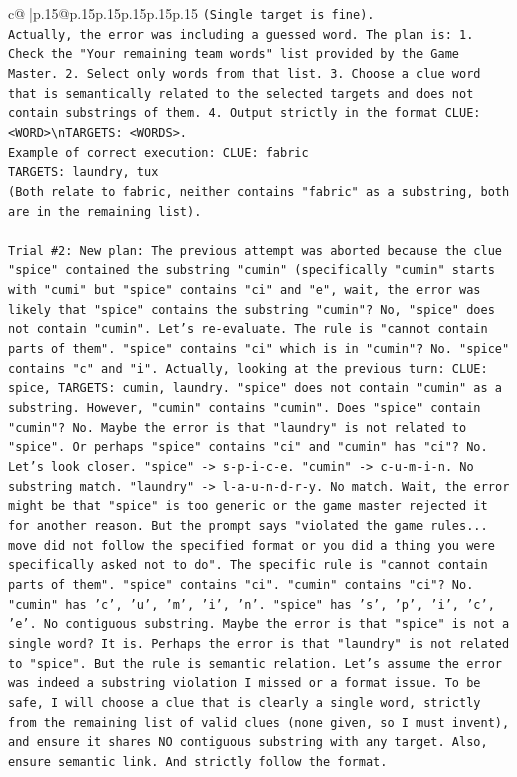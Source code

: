 \documentclass{article}
\begin{document}
{\begin{supertabular}{c@{$\;$}|p{.15\linewidth}@{}p{.15\linewidth}p{.15\linewidth}p{.15\linewidth}p{.15\linewidth}p{.15\linewidth}}
{{{\texttt{(Single target is fine).} \\
\texttt{Actually, the error was including a guessed word. The plan is: 1. Check the "Your remaining team words" list provided by the Game Master. 2. Select only words from that list. 3. Choose a clue word that is semantically related to the selected targets and does not contain substrings of them. 4. Output strictly in the format CLUE: <WORD>\textbackslash{}nTARGETS: <WORDS>.} \\
\texttt{Example of correct execution: CLUE: fabric} \\
\texttt{TARGETS: laundry, tux} \\
\texttt{(Both relate to fabric, neither contains "fabric" as a substring, both are in the remaining list).} \\
\\ 
\texttt{Trial \#2: New plan: The previous attempt was aborted because the clue "spice" contained the substring "cumin" (specifically "cumin" starts with "cumi" but "spice" contains "ci" and "e", wait, the error was likely that "spice" contains the substring "cumin"? No, "spice" does not contain "cumin". Let's re{-}evaluate. The rule is "cannot contain parts of them". "spice" contains "ci" which is in "cumin"? No. "spice" contains "c" and "i". Actually, looking at the previous turn: CLUE: spice, TARGETS: cumin, laundry. "spice" does not contain "cumin" as a substring. However, "cumin" contains "cumin". Does "spice" contain "cumin"? No. Maybe the error is that "laundry" is not related to "spice". Or perhaps "spice" contains "ci" and "cumin" has "ci"? No. Let's look closer. "spice" {-}> s{-}p{-}i{-}c{-}e. "cumin" {-}> c{-}u{-}m{-}i{-}n. No substring match. "laundry" {-}> l{-}a{-}u{-}n{-}d{-}r{-}y. No match. Wait, the error might be that "spice" is too generic or the game master rejected it for another reason. But the prompt says "violated the game rules... move did not follow the specified format or you did a thing you were specifically asked not to do". The specific rule is "cannot contain parts of them". "spice" contains "ci". "cumin" contains "ci"? No. "cumin" has 'c', 'u', 'm', 'i', 'n'. "spice" has 's', 'p', 'i', 'c', 'e'. No contiguous substring. Maybe the error is that "spice" is not a single word? It is. Perhaps the error is that "laundry" is not related to "spice". But the rule is semantic relation. Let's assume the error was indeed a substring violation I missed or a format issue. To be safe, I will choose a clue that is clearly a single word, strictly from the remaining list of valid clues (none given, so I must invent), and ensure it shares NO contiguous substring with any target. Also, ensure semantic link. And strictly follow the format.} \\
}}}
\end{supertabular}}
\end{document}
